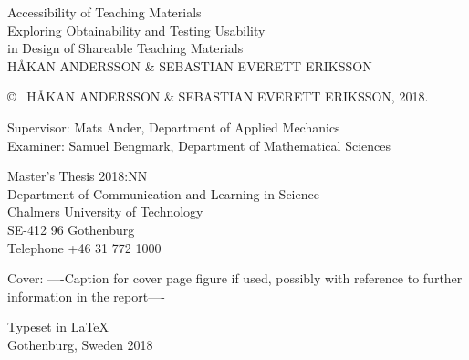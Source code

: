 \newpage
\thispagestyle{plain}
\vspace*{4.5cm}
Accessibility of Teaching Materials\\
Exploring Obtainability and Testing Usability \\[0.1cm] in Design of Shareable Teaching Materials\\
HÅKAN ANDERSSON \& SEBASTIAN EVERETT ERIKSSON  \setlength{\parskip}{1cm}

\copyright ~ HÅKAN ANDERSSON \& SEBASTIAN EVERETT ERIKSSON, 2018. \setlength{\parskip}{1cm}

Supervisor: Mats Ander, Department of Applied Mechanics\\
Examiner: Samuel Bengmark, Department of Mathematical Sciences \setlength{\parskip}{1cm}

Master's Thesis 2018:NN\\	%
Department of Communication and Learning in Science\\
Chalmers University of Technology\\
SE-412 96 Gothenburg\\
Telephone +46 31 772 1000 \setlength{\parskip}{0.5cm}

\vfill
Cover: ----Caption for cover page figure if used, possibly with reference to further information in the report---- \setlength{\parskip}{0.5cm}

Typeset in \LaTeX \\
Gothenburg, Sweden 2018

